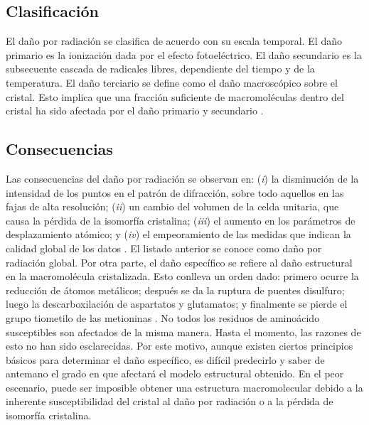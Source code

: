 \subsection{Clasificación}
El daño por radiación se clasifica de acuerdo con su escala temporal. El daño primario es la ionización dada por el efecto fotoeléctrico. El daño secundario es la subsecuente cascada de radicales libres, dependiente del tiempo y de la temperatura. El daño terciario se define como el daño macroscópico sobre el cristal. Esto implica que una fracción suficiente de macromoléculas dentro del cristal ha sido afectada por el daño primario y secundario .

\subsection{Consecuencias}
Las consecuencias del daño por radiación se observan en: (\emph{i}) la disminución de la intensidad de los puntos en el patrón de difracción, sobre todo aquellos en las fajas de alta resolución; (\emph{ii}) un cambio del volumen de la celda unitaria, que causa la pérdida de la isomorfía cristalina; (\emph{iii}) el aumento en los parámetros de desplazamiento atómico; y (\emph{iv}) el empeoramiento de las medidas que indican la calidad global de los datos \cite{Teng2000}. El listado anterior se conoce como daño por radiación global. Por otra parte, el daño específico se refiere al daño estructural en la macromolécula cristalizada. Esto conlleva un orden dado: primero ocurre la reducción de átomos metálicos; después se da la ruptura de puentes disulfuro; luego la descarboxilación de aspartatos y glutamatos; y finalmente se pierde el grupo tiometilo de las metioninas . No todos los residuos de aminoácido susceptibles son afectados de la misma manera. Hasta el momento, las razones de esto no han sido esclarecidas. Por este motivo, aunque existen ciertos principios básicos para determinar el daño específico, es difícil predecirlo y saber de antemano el grado en que afectará el modelo estructural obtenido. En el peor escenario, puede ser imposible obtener una estructura macromolecular debido a la inherente susceptibilidad del cristal al daño por radiación o a la pérdida de isomorfía cristalina.

